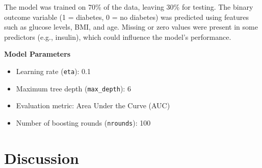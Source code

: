 \documentclass[12pt]{article}
\begin{document}
The model was trained on 70\% of the data, leaving 30\% for testing. The binary outcome variable (1 = diabetes, 0 = no diabetes) was predicted using features such as glucose levels, BMI, and age. Missing or zero values were present in some predictors (e.g., insulin), which could influence the model's performance.

\textbf{Model Parameters}
\begin{itemize}
	\item Learning rate (\texttt{eta}): 0.1
	\item Maximum tree depth (\texttt{max\_depth}): 6
	\item Evaluation metric: Area Under the Curve (AUC)
	\item Number of boosting rounds (\texttt{nrounds}): 100
\end{itemize}

\section{Discussion}
\end{document}
